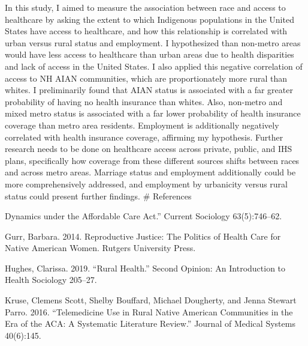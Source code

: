 \documentclass[11pt,]{article}
\begin{document}
In this study, I aimed to measure the association between race and
access to healthcare by asking the extent to which Indigenous
populations in the United States have access to healthcare, and how this
relationship is correlated with urban versus rural status and
employment. I hypothesized than non-metro areas would have less access
to healthcare than urban areas due to health disparities and lack of
access in the United States. I also applied this negative correlation of
access to NH AIAN communities, which are proportionately more rural than
whites. I preliminarily found that AIAN status is associated with a far
greater probability of having no health insurance than whites. Also,
non-metro and mixed metro status is associated with a far lower
probability of health insurance coverage than metro area residents.
Employment is additionally negatively correlated with health insurance
coverage, affirming my hypothesis. Further research needs to be done on
healthcare access across private, public, and IHS plans, specifically
how coverage from these different sources shifts between races and
across metro areas. Marriage status and employment additionally could be
more comprehensively addressed, and employment by urbanicity versus
rural status could present further findings. \# References

Dynamics under the Affordable Care Act.'' Current Sociology
63(5):746--62.

Gurr, Barbara. 2014. Reproductive Justice: The Politics of Health Care
for Native American Women. Rutgers University Press.

Hughes, Clarissa. 2019. ``Rural Health.'' Second Opinion: An
Introduction to Health Sociology 205--27.

Kruse, Clemens Scott, Shelby Bouffard, Michael Dougherty, and Jenna
Stewart Parro. 2016. ``Telemedicine Use in Rural Native American
Communities in the Era of the ACA: A Systematic Literature Review.''
Journal of Medical Systems 40(6):145.




\end{document}
